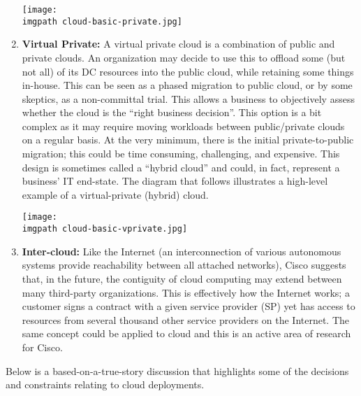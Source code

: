\begin{enumerate}
    \begin{minipage}[t]{\linewidth}
	  \centering
      \texttt{[image: \\imgpath cloud-basic-private.jpg]}
    \end{minipage}

  \item \textbf{Virtual Private:} A virtual private cloud is a combination of
  public and private clouds. An organization may decide to use this to offload
  some (but not all) of its DC resources into the public cloud, while
  retaining some things in-house. This can be seen as a phased migration to
  public cloud, or by some skeptics, as a non-committal trial. This allows a
  business to objectively assess whether the cloud is the ``right business
  decision''. This option is a bit complex as it may require moving workloads
  between public/private clouds on a regular basis. At the very minimum, there
  is the initial private-to-public migration; this could be time consuming,
  challenging, and expensive. This design is sometimes called a ``hybrid cloud''
  and could, in fact, represent a business’ IT end-state. The diagram that
  follows illustrates a high-level example of a virtual-private (hybrid) cloud.

    \begin{minipage}[t]{\linewidth}
	  \centering
      \texttt{[image: \\imgpath cloud-basic-vprivate.jpg]}
    \end{minipage}

  \item \textbf{Inter-cloud:} Like the Internet (an interconnection of various
  autonomous systems provide reachability between all attached networks),
  Cisco suggests that, in the future, the contiguity of cloud computing may
  extend between many third-party organizations. This is effectively how the
  Internet works; a customer signs a contract with a given service provider
  (SP) yet has access to resources from several thousand other service
  providers on the Internet. The same concept could be applied to cloud and
  this is an active area of research for Cisco.
\end{enumerate}

Below is a based-on-a-true-story discussion that highlights some of the
decisions and constraints relating to cloud deployments.

